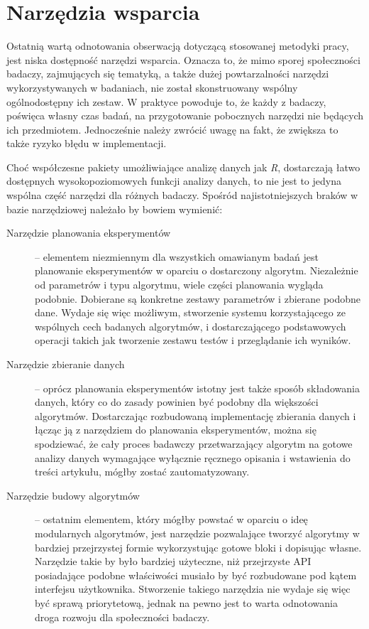 \documentclass[12pt,a4paper]{report}
\begin{document}
{{{{{{\section{Narzędzia wsparcia}
\par{
Ostatnią wartą odnotowania obserwacją dotyczącą stosowanej metodyki pracy, jest niska dostępność narzędzi wsparcia. Oznacza to, że mimo sporej społeczności badaczy, zajmujących się tematyką, a także dużej powtarzalności narzędzi wykorzystywanych w badaniach, nie został skonstruowany wspólny ogólnodostępny ich zestaw. W praktyce powoduje to, że każdy z badaczy, poświęca własny czas badań, na przygotowanie pobocznych narzędzi nie będących ich przedmiotem. Jednocześnie należy zwrócić uwagę na fakt, że zwiększa to także ryzyko błędu w implementacji.
}
\par{
Choć współczesne pakiety umożliwiające analizę danych jak \emph{R}, dostarczają łatwo dostępnych wysokopoziomowych funkcji analizy danych, to nie jest to jedyna wspólna część narzędzi dla różnych badaczy. Spośród najistotniejszych braków w bazie narzędziowej należało by bowiem wymienić:
\begin{description}
\item[Narzędzie planowania eksperymentów] -- elementem niezmiennym dla wszystkich omawianym badań jest planowanie eksperymentów w oparciu o dostarczony algorytm. Niezależnie od parametrów i typu algorytmu, wiele części planowania wygląda podobnie. Dobierane są konkretne zestawy parametrów i zbierane podobne dane. Wydaje się więc możliwym, stworzenie systemu korzystającego ze wspólnych cech badanych algorytmów, i dostarczającego podstawowych operacji takich jak tworzenie zestawu testów i przeglądanie ich wyników.
\item[Narzędzie zbieranie danych] -- oprócz planowania eksperymentów istotny jest także sposób składowania danych, który co do zasady powinien być podobny dla większości algorytmów. Dostarczając rozbudowaną implementację zbierania danych i łącząc ją z narzędziem do planowania eksperymentów, można się spodziewać, że cały proces badawczy przetwarzający algorytm na gotowe analizy danych wymagające wyłącznie ręcznego opisania i wstawienia do treści artykułu, mógłby zostać zautomatyzowany.
\item[Narzędzie budowy algorytmów] -- ostatnim elementem, który mógłby powstać w oparciu o ideę modularnych algorytmów, jest narzędzie pozwalające tworzyć algorytmy w bardziej przejrzystej formie wykorzystując gotowe bloki i dopisując własne. Narzędzie takie by było bardziej użyteczne, niż przejrzyste API posiadające podobne właściwości musiało by być rozbudowane pod kątem interfejsu użytkownika. Stworzenie takiego narzędzia nie wydaje się więc być sprawą priorytetową, jednak na pewno jest to warta odnotowania droga rozwoju dla społeczności badaczy.

\end{description}}}}}}}}
\end{document}
